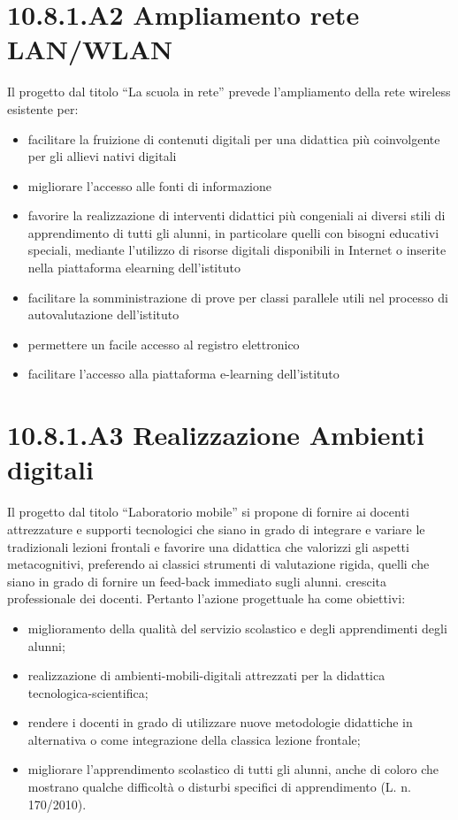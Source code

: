 \documentclass[12pt,a4paper,oneside]{memoir}
\begin{document}
\section{10.8.1.A2 Ampliamento rete LAN/WLAN} 
Il progetto dal titolo “La scuola in rete” prevede l'ampliamento della rete wireless esistente per:
\begin{itemize}
\item facilitare la fruizione di contenuti digitali per una didattica più coinvolgente per gli allievi nativi digitali
\item migliorare l’accesso alle fonti di informazione
\item favorire la realizzazione di interventi didattici più congeniali ai diversi stili di apprendimento di tutti gli alunni, in particolare quelli con bisogni educativi speciali, mediante l'utilizzo di risorse digitali disponibili in Internet o inserite nella piattaforma elearning dell'istituto
\item facilitare la somministrazione di prove per classi parallele utili nel processo di autovalutazione dell’istituto
\item permettere un facile accesso al registro elettronico
\item facilitare l’accesso alla piattaforma e-learning dell’istituto
\end{itemize}

\section{10.8.1.A3 Realizzazione Ambienti digitali}
Il progetto dal titolo “Laboratorio mobile”  si propone di fornire ai docenti attrezzature e supporti tecnologici che siano in grado di integrare e variare le tradizionali lezioni frontali e favorire una didattica che valorizzi gli aspetti metacognitivi, preferendo ai classici strumenti di valutazione rigida, quelli che siano in grado di fornire un feed-back immediato sugli alunni. crescita professionale dei docenti. Pertanto l'azione progettuale ha come obiettivi:
\begin{itemize}
\item miglioramento della qualità del servizio scolastico e degli apprendimenti degli alunni;
\item realizzazione di ambienti-mobili-digitali attrezzati per la didattica tecnologica-scientifica;
\item rendere i docenti in grado di utilizzare nuove metodologie didattiche in alternativa o come integrazione della classica lezione frontale;
\item migliorare l'apprendimento scolastico di tutti gli alunni, anche di coloro che mostrano qualche difficoltà o disturbi specifici di apprendimento (L. n. 170/2010).
\end{itemize}
\end{document}
